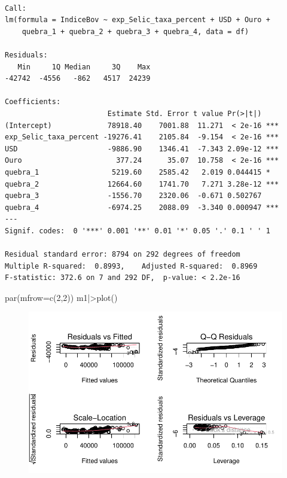 \documentclass[
  letterpaper,
  DIV=11,
  numbers=noendperiod]{scrartcl}
\newenvironment{Shaded}{\begin{snugshade}}{\end{snugshade}}
\newcommand{\AttributeTok}[1]{\textcolor[rgb]{0.40,0.45,0.13}{#1}}
\newcommand{\DecValTok}[1]{\textcolor[rgb]{0.68,0.00,0.00}{#1}}
\newcommand{\FunctionTok}[1]{\textcolor[rgb]{0.28,0.35,0.67}{#1}}
\newcommand{\NormalTok}[1]{\textcolor[rgb]{0.00,0.23,0.31}{#1}}
\newcommand{\SpecialCharTok}[1]{\textcolor[rgb]{0.37,0.37,0.37}{#1}}
\begin{document}
\begin{verbatim}

Call:
lm(formula = IndiceBov ~ exp_Selic_taxa_percent + USD + Ouro + 
    quebra_1 + quebra_2 + quebra_3 + quebra_4, data = df)

Residuals:
   Min     1Q Median     3Q    Max 
-42742  -4556   -862   4517  24239 

Coefficients:
                        Estimate Std. Error t value Pr(>|t|)    
(Intercept)             78918.40    7001.88  11.271  < 2e-16 ***
exp_Selic_taxa_percent -19276.41    2105.84  -9.154  < 2e-16 ***
USD                     -9886.90    1346.41  -7.343 2.09e-12 ***
Ouro                      377.24      35.07  10.758  < 2e-16 ***
quebra_1                 5219.60    2585.42   2.019 0.044415 *  
quebra_2                12664.60    1741.70   7.271 3.28e-12 ***
quebra_3                -1556.70    2320.06  -0.671 0.502767    
quebra_4                -6974.25    2088.09  -3.340 0.000947 ***
---
Signif. codes:  0 '***' 0.001 '**' 0.01 '*' 0.05 '.' 0.1 ' ' 1

Residual standard error: 8794 on 292 degrees of freedom
Multiple R-squared:  0.8993,    Adjusted R-squared:  0.8969 
F-statistic: 372.6 on 7 and 292 DF,  p-value: < 2.2e-16
\end{verbatim}

\begin{Shaded}
\begin{Highlighting}[]
\FunctionTok{par}\NormalTok{(}\AttributeTok{mfrow=}\FunctionTok{c}\NormalTok{(}\DecValTok{2}\NormalTok{,}\DecValTok{2}\NormalTok{))}
\NormalTok{m1}\SpecialCharTok{|\textgreater{}}\FunctionTok{plot}\NormalTok{()}
\end{Highlighting}
\end{Shaded}

\begin{figure}[H]

{\centering \includegraphics{DemonstracaoStrucchange_files/figure-pdf/unnamed-chunk-18-1.pdf}

}

\end{figure}
\end{document}
